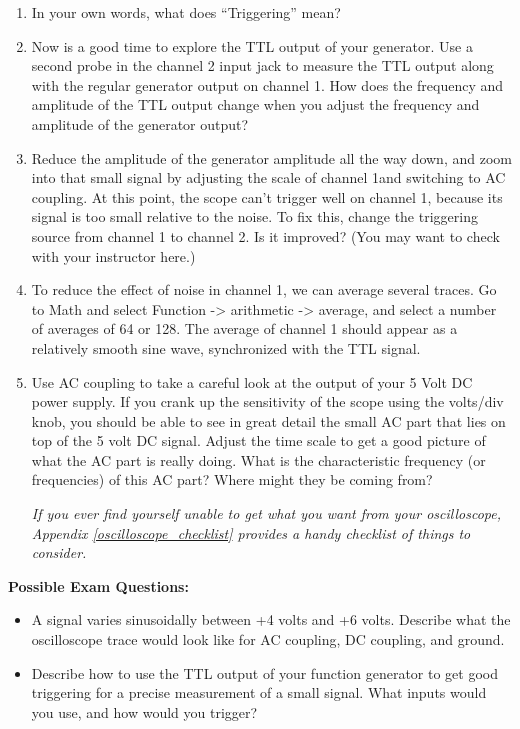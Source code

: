\begin{enumerate}[wide]
\item In your own words, what does ``Triggering'' mean?

\item Now is a good time to explore the TTL output of your generator.  Use a second probe in the channel 2 input jack to measure the TTL output along with the regular generator output on channel 1.  How does the frequency and amplitude of the TTL output change when you adjust the frequency and amplitude of the generator output?

\item Reduce the amplitude of the generator amplitude all the way down, and zoom into that small signal by adjusting the scale of channel 1and switching to AC coupling.  At this point, the scope can't trigger well on channel 1, because its signal is too small relative to the noise.  To fix this, change the triggering source from channel 1 to channel 2.  Is it improved?  (You may want to check with your instructor here.)

\item To reduce the effect of noise in channel 1, we can average several traces.  Go to Math and select Function -> arithmetic -> average, and select a number of averages of 64 or 128.  The average of channel 1 should appear as a relatively smooth sine wave, synchronized with the TTL signal.

\item Use AC coupling to take a careful look at the output of your 5 Volt DC power supply.  If you crank up the sensitivity of the scope using the volts/div knob, you should be able to see in great detail the small AC part that lies on top of the 5 volt DC signal.  Adjust the time scale to get a good picture of what the AC part is really doing.  What is the characteristic frequency (or frequencies) of this AC part?  Where might they be coming from?

\bigskip

\textit{If you ever find yourself unable to get what you want from your oscilloscope, Appendix \ref{oscilloscope_checklist} provides a handy checklist of things to consider.}

\end{enumerate}

\vfill

\textbf{Possible Exam Questions:}

\begin{itemize}

\item A signal varies sinusoidally between +4 volts and +6 volts.  Describe what the oscilloscope trace would look like for AC coupling, DC coupling, and ground.

\item Describe how to use the TTL output of your function generator to get good triggering for a precise measurement of a small signal. What inputs would you use, and how would you trigger? 

\end{itemize}





